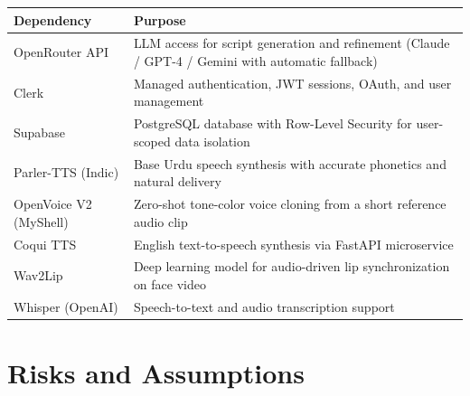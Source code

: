 ﻿\documentclass[12pt, a4paper]{article}
\newcommand{\thead}[1]{\cellcolor{headerbg}\textcolor{headertext}{\textbf{#1}}}
\newcommand{\talt}{\rowcolor{rowalt}}
\begin{document}
\begin{tabular}{>{\raggedright\arraybackslash}p{3.8cm}
                >{\raggedright\arraybackslash}p{10.0cm}}
  \toprule
  \thead{Dependency} & \thead{Purpose} \\
  \midrule
  OpenRouter API
    & LLM access for script generation and refinement (Claude / GPT-4 / Gemini
      with automatic fallback) \\
  \talt
  Clerk
    & Managed authentication, JWT sessions, OAuth, and user management \\
  Supabase
    & PostgreSQL database with Row-Level Security for user-scoped data isolation \\
  \talt
  Parler-TTS (Indic)
    & Base Urdu speech synthesis with accurate phonetics and natural delivery \\
  OpenVoice V2 (MyShell)
    & Zero-shot tone-color voice cloning from a short reference audio clip \\
  \talt
  Coqui TTS
    & English text-to-speech synthesis via FastAPI microservice \\
  Wav2Lip
    & Deep learning model for audio-driven lip synchronization on face video \\
  \talt
  Whisper (OpenAI)
    & Speech-to-text and audio transcription support \\
  \bottomrule
\end{tabular}

\section{Risks and Assumptions}
\end{document}
